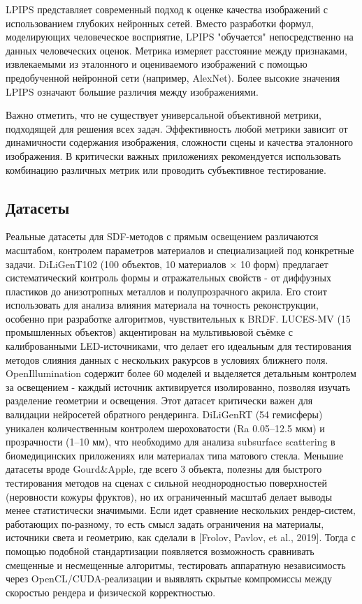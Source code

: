 \documentclass[a4paper,hidelinks,12pt]{article}
\begin{document}
LPIPS представляет современный подход к оценке качества изображений с использованием глубоких нейронных сетей. Вместо разработки формул, моделирующих человеческое восприятие, LPIPS "обучается" непосредственно на данных человеческих оценок.
Метрика измеряет расстояние между признаками, извлекаемыми из эталонного и оцениваемого изображений с помощью предобученной нейронной сети (например, AlexNet). Более высокие значения LPIPS означают большие различия между изображениями.

Важно отметить, что не существует универсальной объективной метрики, подходящей для решения всех задач. Эффективность любой метрики зависит от динамичности содержания изображения, сложности 
сцены и качества эталонного изображения. В критически важных приложениях рекомендуется использовать комбинацию различных метрик или проводить субъективное тестирование.

\newpage

\subsection{Датасеты}

Реальные датасеты для SDF-методов с прямым освещением различаются масштабом, контролем параметров материалов и специализацией под 
конкретные задачи. \newline DiLiGenT102 (100 объектов, 10 материалов × 10 форм) предлагает систематический контроль формы и отражательных 
свойств - от диффузных пластиков до анизотропных металлов и полупрозрачного акрила. Его стоит использовать для анализа влияния материала 
на точность реконструкции, особенно при разработке алгоритмов, чувствительных к BRDF. LUCES-MV (15 промышленных объектов) акцентирован 
на мультивьювой съёмке с калиброванными LED-источниками, что делает его идеальным для тестирования методов слияния данных с нескольких 
ракурсов в условиях ближнего поля. OpenIllumination содержит более 60 моделей и выделяется детальным контролем за освещением - каждый источник активируется изолированно, 
позволяя изучать разделение геометрии и освещения. Этот датасет критически важен для валидации нейросетей 
обратного рендеринга. DiLiGenRT (54 гемисферы) уникален количественным контролем шероховатости (Ra 0.05–12.5 мкм) 
и прозрачности (1–10 мм), что необходимо для анализа subsurface scattering в биомедицинских приложениях или материалах типа матового стекла.
Меньшие датасеты вроде Gourd\&Apple, где всего 3 объекта, полезны для быстрого тестирования методов на сценах с сильной неоднородностью поверхностей (неровности кожуры фруктов), 
но их ограниченный масштаб делает выводы менее статистически значимыми. Если идет сравнение нескольких рендер-систем, работающих по-разному, то есть смысл 
задать ограничения на материалы, источники света и геометрию, как сделали в [Frolov, Pavlov, et al., 2019]. Тогда с помощью подобной стандартизации появляется возможность сравнивать
смещенные и несмещенные алгоритмы, тестировать аппаратную независимость через OpenCL/CUDA-реализации и выявлять скрытые компромиссы между скоростью рендера и физической корректностью. 
\end{document}
